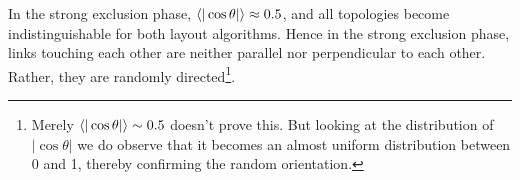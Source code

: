 \documentclass[nofootinbib,preprint,floatfix,titlepage,endfloats]{revtex4} %
\begin{document}
In the strong exclusion phase, $\be{|\cos\theta|} \approx 0.5 $, and all topologies become indistinguishable for both layout algorithms. 
Hence in the strong exclusion phase, links touching each other are neither parallel nor perpendicular to each other.
Rather, they are randomly directed\footnote{Merely  $\be{|\cos\theta|} \sim 0.5 $ doesn't prove this. But looking at the distribution of $|\cos\theta|$ we do observe that it becomes an almost uniform distribution between 0 and 1, thereby confirming the random orientation.}. 
\end{document}
